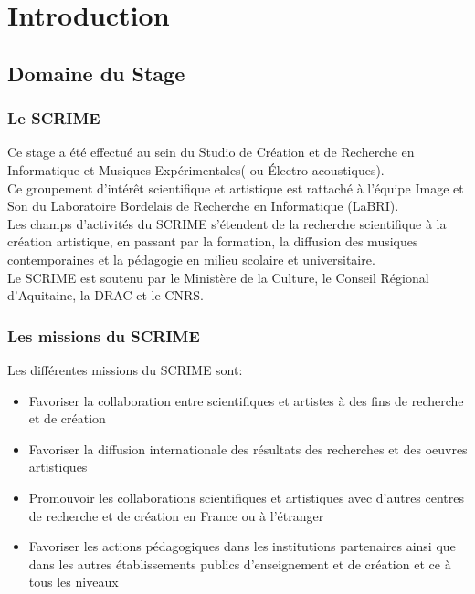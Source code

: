 \documentclass[a4paper, 12pt]{report}
\begin{document}
\tableofcontents %

\chapter{Introduction}
\section{Domaine du Stage}
\subsection{Le SCRIME}
\label{SCRIME}
Ce stage a été effectué au sein du Studio de Création et de Recherche en Informatique et Musiques Expérimentales( ou Électro-acoustiques).\cite{SCRIME2016}\\
Ce groupement d'intérêt scientifique et artistique est rattaché à l'équipe Image et Son du Laboratoire Bordelais de Recherche en Informatique (LaBRI).\\
Les champs d'activités du SCRIME \pageref{SCRIME} s'étendent de la recherche scientifique à la création artistique, en passant par la formation, la diffusion des musiques contemporaines et la pédagogie en milieu scolaire et universitaire. \\
Le SCRIME \pageref{SCRIME} est soutenu par le Ministère de la Culture, le Conseil Régional d'Aquitaine, la DRAC et le CNRS.\\

\subsection{Les missions du SCRIME \pageref{SCRIME}}
Les différentes missions du SCRIME \cite{SCRIME2016} sont:
\begin{itemize}
\item Favoriser la collaboration entre scientifiques et artistes à des fins de recherche et de création
\item Favoriser la diffusion internationale des résultats des recherches et des oeuvres artistiques
\item Promouvoir les collaborations scientifiques et artistiques avec d'autres centres de recherche et de création en France ou à l'étranger
\item Favoriser les actions pédagogiques dans les institutions partenaires ainsi que dans les autres établissements publics d'enseignement et de création et ce à tous les niveaux 
\end{itemize}
\end{document}
